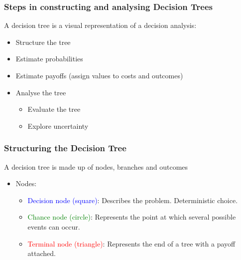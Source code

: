 \begin{frame}
\frametitle{Steps in constructing and analysing Decision Trees}
A decision tree is a visual representation of a decision analysis:
	\begin{itemize}
		\item \alert{Structure} the tree
		\pause
		\item Estimate \alert{probabilities}
		\pause
		\item Estimate \alert{payoffs} (assign values to costs and outcomes)
		\pause
		\item Analyse the tree
		\pause
			\begin{itemize}
				\item \alert{Evaluate} the tree
				\item Explore \alert{uncertainty}
			\end{itemize}
	\end{itemize}
\end{frame}

\begin{frame}
\frametitle{Structuring the Decision Tree}
A decision tree is made up of nodes, branches and outcomes

\begin{itemize}
	\item Nodes:
	\begin{itemize}
		\pause
		\item \textcolor{blue}{Decision node (square)}: Describes the problem. Deterministic choice.
		\pause
		\item \textcolor{green}{Chance node (circle)}: Represents the point at which several possible events can occur.
		\pause
		\item \textcolor{red}{Terminal node (triangle)}: Represents the end of a tree with a payoff attached.
	\end{itemize}
\end{itemize}
\end{frame}

